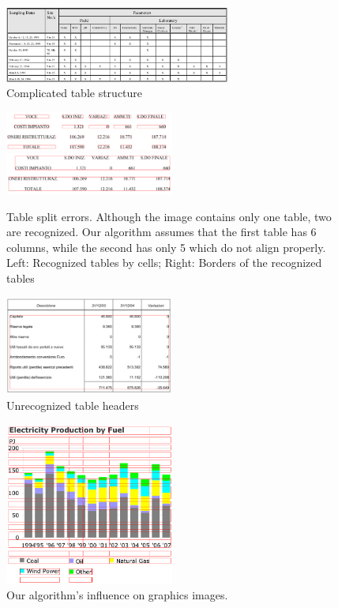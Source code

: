\begin{figure}[t]
\centering
\includegraphics[width=20em]{img/results/errorStructure.jpg}
\caption{Complicated table structure}
\label{fig:errorTableStructures}
\end{figure}

\begin{figure}[t]
\centering

\includegraphics[width=15em]{img/results/otherErr1Cell.png}
\qquad
\includegraphics[width=15em]{img/results/otherErr1Table.png}

\caption{Table split errors. Although the image contains only one table, two are recognized. Our algorithm assumes that the first table has 6 columns, while the second has only 5 which do not align properly.
Left: Recognized tables by cells; Right: Borders of the recognized tables}
\label{fig:errorsOtherSplit}
\end{figure}

\begin{figure}[t]
\centering
\includegraphics[width=15em]{img/results/otherErr2.png}
\caption{Unrecognized table headers}
\label{fig:errorsOtherHeaders}
\end{figure}

\begin{figure}[t]
\centering
\includegraphics[width=15em]{img/results/otherErr3.png}
\caption{Our algorithm's influence on graphics images.}
\label{fig:errorsOtherGraphics}
\end{figure}

